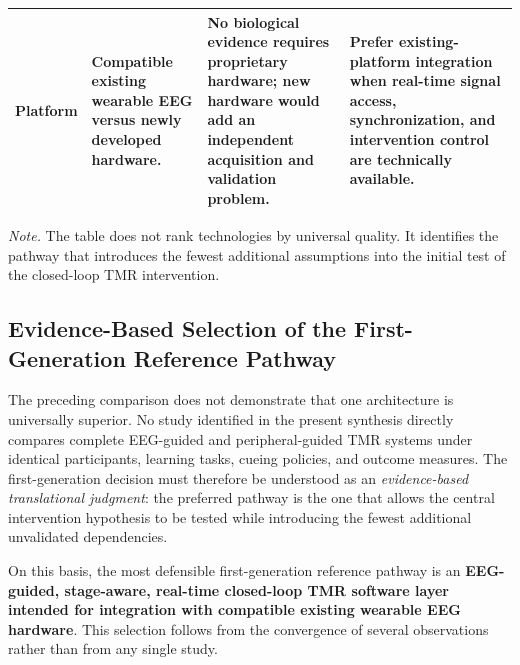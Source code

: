 \begin{table}[t]
\begin{tabularx}{\textwidth}{
@{}
>{\raggedright\arraybackslash}p{2.5cm}
>{\raggedright\arraybackslash}X
>{\raggedright\arraybackslash}X
>{\raggedright\arraybackslash}X
@{}
}
\addlinespace[1.2mm]

\textbf{Platform}
&
Compatible existing wearable EEG versus newly developed hardware.
&
No biological evidence requires proprietary hardware; new hardware would add
an independent acquisition and validation problem.
&
Prefer existing-platform integration when real-time signal access,
synchronization, and intervention control are technically available.
\\

\bottomrule

\end{tabularx}

\vspace{1mm}

\begin{minipage}{\textwidth}
\footnotesize
\textit{Note.}
The table does not rank technologies by universal quality. It identifies the
pathway that introduces the fewest additional assumptions into the initial
test of the closed-loop TMR intervention.
\end{minipage}

\end{table}


\subsection{Evidence-Based Selection of the First-Generation Reference Pathway}

The preceding comparison does not demonstrate that one architecture is
universally superior. No study identified in the present synthesis directly
compares complete EEG-guided and peripheral-guided TMR systems under identical
participants, learning tasks, cueing policies, and outcome measures. The
first-generation decision must therefore be understood as an
\textit{evidence-based translational judgment}: the preferred pathway is the one
that allows the central intervention hypothesis to be tested while introducing
the fewest additional unvalidated dependencies.

On this basis, the most defensible first-generation reference pathway is an
\textbf{EEG-guided, stage-aware, real-time closed-loop TMR software layer
intended for integration with compatible existing wearable EEG hardware}.
This selection follows from the convergence of several observations rather than
from any single study.

